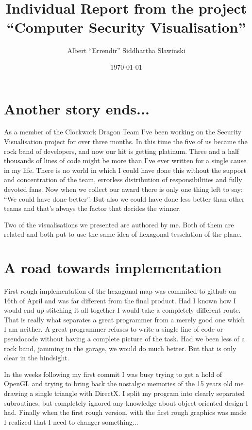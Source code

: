 \documentclass[12pt,a4paper]{article}
\author{Albert ``Errendir'' Siddhartha Slawinski}
\title{Individual Report from the project ``Computer Security Visualisation''}
\date{\today}
\begin{document}
	
	\maketitle

    \section*{Another story ends...}
	As a member of the Clockwork Dragon Team I've been working on the Security Visualisation project for over three months. In this time the five of us became the rock band of developers, and now our hit is getting platinum.
	Three and a half thousands of lines of code might be more than I've ever written for a single cause in my life. There is no world in which I could have done this without the support and concentration of the team, errorless distribution of responsibilities and fully devoted fans.
	Now when we collect our award there is only one thing left to say: ``We could have done better''. But also we could have done less better than other teams and that's always the factor that decides the winner.
	
	Two of the visualisations we presented are authored by me. Both of them are related and both put to use the same idea of hexagonal tesselation of the plane.
    \section*{A road towards implementation}
	First rough implementation of the hexagonal map was commited to github on 16th of April and was far different from the final product. Had I known how I would end up stitching it all together I would take a completely different route.
	That is really what separates a great programmer from a merely good one \textemdash  which I am neither. A great programmer refuses to write a single line of code or pseudocode without having a complete picture of the task. Had we been less of a rock band, jamming in the garage, we would do much better. But that is only clear in the hindsight.
	
	
	
	In the weeks following my first commit I was busy trying to get a hold of OpenGL and trying to bring back the nostalgic memories of the 15 years old me drawing a single triangle with DirectX. I split my program into clearly separated subroutines, but completely ignored any knowledge about object oriented design I had.
	Finally when the first rough version, with the first rough graphics was made I realized that I need to changer something...
\end{document}

